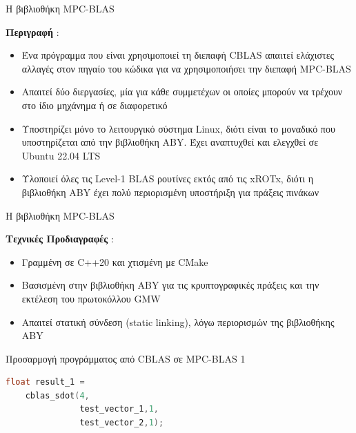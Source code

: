 \documentclass[10pt]{beamer}
\begin{document}
    \begin{frame}{Η βιβλιοθήκη MPC-BLAS}
        \begin{block}{}
        \textbf{Περιγραφή} :
        \begin{itemize}
            \item Ένα πρόγραμμα που είναι χρησιμοποιεί τη διεπαφή CBLAS απαιτεί ελάχιστες αλλαγές στον πηγαίο του κώδικα για να χρησιμοποιήσει την διεπαφή MPC-BLAS
            \item Απαιτεί δύο διεργασίες, μία για κάθε συμμετέχων οι οποίες μπορούν να τρέχουν στο ίδιο μηχάνημα ή σε διαφορετικό
            \item Υποστηρίζει μόνο το λειτουργικό σύστημα Linux, διότι είναι το μοναδικό που υποστηρίζεται από την βιβλιοθήκη ABY. Έχει αναπτυχθεί και ελεγχθεί σε Ubuntu 22.04 LTS
            \item Υλοποιεί όλες τις Level-1 BLAS ρουτίνες εκτός από τις xROTx, διότι η βιβλιοθήκη ABY έχει πολύ περιορισμένη υποστήριξη για πράξεις πινάκων
        \end{itemize}
            \end{block}
    \end{frame}

    \begin{frame}{Η βιβλιοθήκη MPC-BLAS}
        \begin{block}{}
        \textbf{Τεχνικές Προδιαγραφές} :
        \begin{itemize}
            \item Γραμμένη σε C++20 και χτισμένη με CMake
            \item Βασισμένη στην βιβλιοθήκη ABY για τις κρυπτογραφικές πράξεις και την εκτέλεση του πρωτοκόλλου GMW
            \item Απαιτεί στατική σύνδεση (static linking), λόγω περιορισμών της βιβλιοθήκης ABY
        \end{itemize}
            \end{block}
    \end{frame}

    \begin{frame}[fragile]{Προσαρμογή προγράμματος από CBLAS σε MPC-BLAS 1}
        \begin{block}{}
            \begin{lstlisting}[firstnumber=1, xleftmargin=5pt, basicstyle=\footnotesize, language=C++]
float result_1 =
    cblas_sdot(4,
               test_vector_1,1,
               test_vector_2,1);
            \end{lstlisting}
        \end{block}
    \end{frame}
\end{document}
